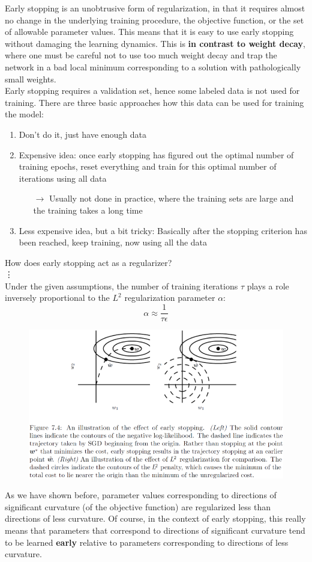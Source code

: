 \begin{multicols}{2}
	Early stopping is an unobtrusive form of regularization, in that it requires almost no change in the underlying training procedure, the objective function, or the set of allowable parameter values.
	This means that it is easy to use early stopping without damaging the learning dynamics.
	This is \textbf{in contrast to weight decay}, where one must be careful not to use too much weight decay and trap the network in a bad local minimum corresponding to a solution with pathologically small weights.\\

	Early stopping requires a validation set, hence some labeled data is not used for training.
	There are three basic approaches how this data can be used for training the model:
	\begin{enumerate}
		\item Don’t do it, just have enough data
		\item Expensive idea: once early stopping has figured out the optimal number of training epochs, reset everything and train for this optimal number of iterations using all data
		\begin{itemize}
			\item[$\rightarrow$] Usually not done in practice, where the training sets are large and the training takes a long time
		\end{itemize}
		\item Less expensive idea, but a bit tricky: Basically after the stopping criterion has been reached, keep training, now using all the data
	\end{enumerate}
	How does early stopping act as a regularizer?\\
	\vdots\\
	Under the given assumptions, the number of training iterations $\tau$ plays a role inversely proportional to the $L^2$ regularization parameter $\alpha$:
	\[ \alpha \approx \frac{1}{\tau\epsilon} \]
	\begin{figure}[H]
		\centering
		\includegraphics[width=1\linewidth]{images/earlyvsl2.png}
	\end{figure}
	As we have shown before, parameter values corresponding to directions of significant curvature (of the objective function) are regularized less than directions of less curvature. Of course, in the context of early stopping, this really means that parameters that correspond to directions of significant curvature tend to be learned \textbf{early} relative to parameters corresponding to directions of less curvature.

\end{multicols}

